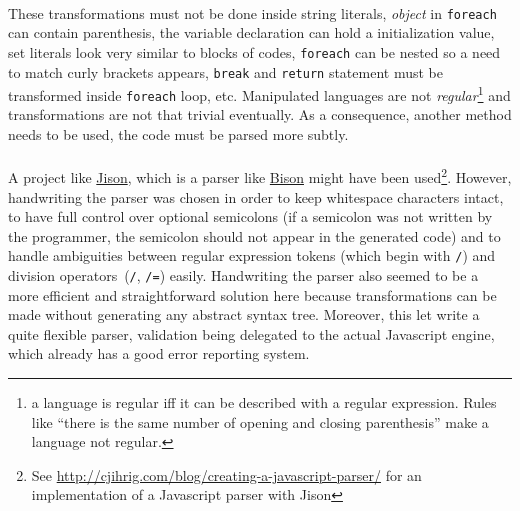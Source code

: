 \paragraph{}
These transformations must not be done inside string literals, {\itshape object} in \lstinline!foreach! can contain parenthesis, the variable declaration can hold a initialization value, set literals look very similar to blocks of codes, \lstinline!foreach! can be nested so a need to match curly brackets appears, \lstinline!break! and \lstinline!return! statement must be transformed inside \lstinline!foreach! loop, etc. Manipulated languages are not {\itshape regular}\footnote{a language is regular iff it can be described with a regular expression. Rules like “there is the same number of opening and closing parenthesis” make a language not regular.} and transformations are not that trivial eventually. As a consequence, another method needs to be used, the code must be parsed more subtly.

\paragraph{}
A project like \href{http://zaach.github.io/jison/}{Jison}, which is a parser like \href{http://www.gnu.org/software/bison/}{Bison} might have been used\footnote{See \href{http://cjihrig.com/blog/creating-a-javascript-parser/}{http://cjihrig.com/blog/creating-a-javascript-parser/} for an implementation of a Javascript parser with Jison}. However, handwriting the parser was chosen in order to keep whitespace characters intact, to have full control over optional semicolons (if a semicolon was not written by the programmer, the semicolon should not appear in the generated code) and to handle ambiguities between regular expression tokens (which begin with \lstinline!/!) and division operators (\lstinline!/!, \lstinline!/=!) easily. Handwriting the parser also seemed to be a more efficient and straightforward solution here because transformations can be made without generating any abstract syntax tree. Moreover, this let write a quite flexible parser, validation being delegated to the actual Javascript engine, which already has a good error reporting system.
